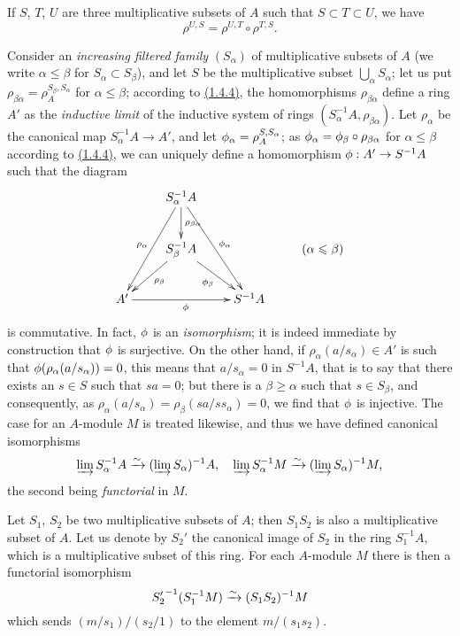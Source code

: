 \begin{env}[1.4.4]
\label{env-0.1.4.4}
If $S$, $T$, $U$ are three multiplicative subsets of $A$ such that
$S\subset T\subset U$, we have
\[
  \rho^{U,S}=\rho^{U,T}\circ\rho^{T,S}.
\]
\end{env}

\begin{env}[1.4.5]
\label{env-0.1.4.5}
Consider an {\em increasing filtered family} $(S_\alpha)$ of multiplicative
subsets of $A$ (we write $\alpha\leqslant\beta$ for $S_\alpha\subset S_\beta$),
and let $S$ be the multiplicative subset $\bigcup_\alpha S_\alpha$; let us put
$\rho_{\beta\alpha}=\rho_A^{S_\beta,S_\alpha}$ for $\alpha\leqslant\beta$;
according to \hyperref[env-0.1.4.4]{(1.4.4)}, the homomorphisms $\rho_{\beta\alpha}$ define a
ring $A'$ as the {\em inductive limit} of the inductive system of rings
$(S_\alpha^{-1}A,\rho_{\beta\alpha})$. Let $\rho_\alpha$ be the canonical map
$S_\alpha^{-1}A\to A'$, and let $\phi_\alpha=\rho_A^{S,S_\alpha}$; as
$\phi_\alpha=\phi_\beta\circ\rho_{\beta\alpha}$ for $\alpha\leqslant\beta$
according to \hyperref[env-0.1.4.4]{(1.4.4)}, we can uniquely define a homomorphism
$\phi:A'\to S^{-1}A$ such that the diagram
\[
  \xymatrix{
    & S_\alpha^{-1}A\ar[ddl]_{\rho_\alpha}
                    \ar[d]^{\rho_{\beta\alpha}}
                    \ar[rdd]^{\vphi_\alpha}\\
    & S_\beta^{-1}A\ar[ld]^{\rho_\beta}
                   \ar[rd]_{\vphi_\beta}
    & & (\alpha\leqslant\beta)\\
    A'\ar[rr]_\vphi
    & & S^{-1}A
  }
\]
is commutative. In fact, $\phi$ is an {\em isomorphism}; it is indeed
immediate by construction that $\phi$ is surjective. On the other hand, if
$\rho_\alpha(a/s_\alpha)\in A'$ is such that $\phi(\rho_\alpha(a/s_\alpha))=0$,
this means that $a/s_\alpha=0$ in $S^{-1}A$, that is to say that there exists an
$s\in S$ such that $sa=0$; but there is a $\beta\geqslant\alpha$ such that
$s\in S_\beta$, and consequently, as
$\rho_\alpha(a/s_\alpha)=\rho_\beta(sa/ss_\alpha)=0$, we find that $\phi$ is
injective. The case for an $A$-module $M$ is treated likewise, and thus we have
defined canonical isomorphisms
\[
  \varinjlim S_\alpha^{-1}A\xrightarrow{\sim}(\varinjlim S_\alpha)^{-1}A,\quad
  \varinjlim S_\alpha^{-1}M\xrightarrow{\sim}(\varinjlim S_\alpha)^{-1}M,
\]
the second being {\em functorial} in $M$.
\end{env}

\begin{env}[1.4.6]
\label{env-0.1.4.6}
Let $S_1$, $S_2$ be two multiplicative subsets of $A$; then $S_1 S_2$ is also a
multiplicative subset of $A$. Let us denote by $S_2'$ the canonical image of
$S_2$ in the ring $S_1^{-1}A$, which is a multiplicative subset of this ring.
For each $A$-module $M$ there is then a functorial isomorphism
\[
  {S_2'}^{-1}(S_1^{-1}M)\xrightarrow{\sim}(S_1 S_2)^{-1}M
\]
which sends $(m/s_1)/(s_2/1)$ to the element $m/(s_1 s_2)$.
\end{env}

